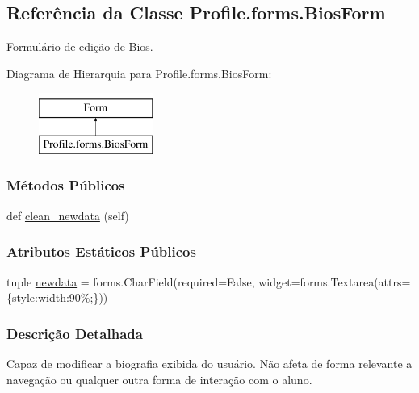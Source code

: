 \hypertarget{classProfile_1_1forms_1_1BiosForm}{}\subsection{Referência da Classe Profile.\+forms.\+Bios\+Form}
\label{classProfile_1_1forms_1_1BiosForm}


Formulário de edição de Bios.  


Diagrama de Hierarquia para Profile.\+forms.\+Bios\+Form\+:\begin{figure}[H]
\begin{center}
\leavevmode
\includegraphics[height=2.000000cm]{d7/d1e/classProfile_1_1forms_1_1BiosForm}
\end{center}
\end{figure}
\subsubsection*{Métodos Públicos}
\begin{DoxyCompactItemize}
\item 
def \hyperlink{classProfile_1_1forms_1_1BiosForm_a678979ab443eaac9e008a140c903d703}{clean\+\_\+newdata} (self)
\end{DoxyCompactItemize}
\subsubsection*{Atributos Estáticos Públicos}
\begin{DoxyCompactItemize}
\item 
tuple \hyperlink{classProfile_1_1forms_1_1BiosForm_a2862b20c24bac9aa5dc896925a2cb3d6}{newdata} = forms.\+Char\+Field(required=False, widget=forms.\+Textarea(attrs=\{\textquotesingle{}style\textquotesingle{}\+:\textquotesingle{}width\+:90\%;\textquotesingle{}\}))
\end{DoxyCompactItemize}


\subsubsection{Descrição Detalhada}
Capaz de modificar a biografia exibida do usuário. Não afeta de forma relevante a navegação ou qualquer outra forma de interação com o aluno. 

